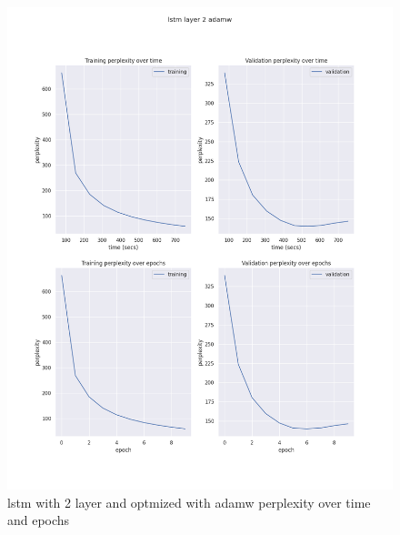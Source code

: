 \documentclass[12pt]{article}
\theoremstyle{definition}
\begin{document}
\begin{figure}[H]
     \centering
     \includegraphics[scale=0.4]{lstm_layer_2_adamw.png}
     \caption{lstm with 2 layer and optmized with adamw perplexity over time and epochs}
\end{figure}
\end{document}
